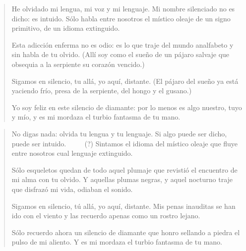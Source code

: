 \documentclass[a4paper, 12pt]{article}
\begin{document}
\pagebreak


\pagebreak

\begin{verse}
    He olvidado mi lengua, mi voz y mi lenguaje.
    Mi nombre silenciado no es dicho: es intuido.
    Sólo habla entre nosotros el místico oleaje 
    de un signo primitivo, de un idioma extinguido.

    Esta adicción enferma no es odio: es lo que traje
    del mundo analfabeto y sin habla de tu olvido.
    (Allí soy como el sueño de un pájaro salvaje 
    que obsequia a la serpiente su corazón vencido.)

    Sigamos en silencio, tu allá, yo aquí, distante.
    (El pájaro del sueño ya está yaciendo frío,
    presa de la serpiente, del hongo y el gusano.)

    Yo soy feliz en este silencio de diamante:
    por lo menos es algo nuestro, tuyo y mío,
    y es mi mordaza el turbio fantasma de tu mano.

    \end{verse}

\pagebreak

\begin{verse}
   No digas nada: olvida tu lengua y tu lenguaje.
   Si algo puede ser dicho, puede ser intuido. $\qquad$ (?)
   Sintamos el idioma del místico oleaje 
   que fluye entre nosotros cual lenguaje extinguido.

   Sólo esqueletos quedan de todo aquel plumaje 
   que revistió el encuentro de mi alma con tu olvido.
   Y aquellas plumas negras, y aquel nocturno traje
   que disfrazó mi vida, odiaban el sonido.

   Sigamos en silencio, tú allá, yo aquí, distante.
   Mis penas inauditas se han ido con el viento 
   y las recuerdo apenas como un rostro lejano.

   Sólo recuerdo ahora un silencio de diamante
   que honro sellando a piedra el pulso de mi aliento.
   Y es mi mordaza el turbio fantasma de tu mano.
   

\end{verse}
\end{document}
